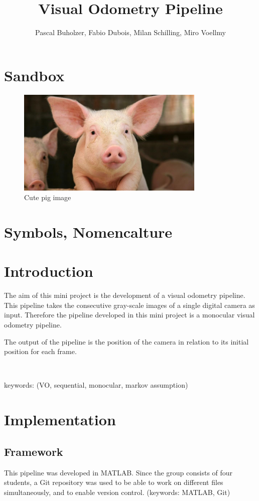 \documentclass[a4paper,10pt]{article} %
\begin{document}
\title{Visual Odometry Pipeline}
\author{Pascal Buholzer, Fabio Dubois, Milan Schilling, Miro Voellmy}
\maketitle

\section{Sandbox}
\begin{figure}[ht]
	\includegraphics[width=0.8\textwidth]{pig}
	\caption{Cute pig image}
	\label{img_pig}
\end{figure}

\newpage
\section{Symbols, Nomencalture}

\newpage
\section{Introduction}
The aim of this mini project is the development of a visual odometry pipeline. This pipeline takes the consecutive gray-scale images of a single digital camera as input. Therefore the pipeline developed in this mini project is a monocular visual odometry pipeline.

The output of the pipeline is the position of the camera in relation to its initial position for each frame.

\

keywords:
(VO, sequential, monocular, markov assumption)

\section{Implementation}

\subsection{Framework}
This pipeline was developed in MATLAB. Since the group consists of four students, a Git repository was used to be able to work on different files simultaneously, and to enable version control.
(keywords: MATLAB, Git)
\end{document}
